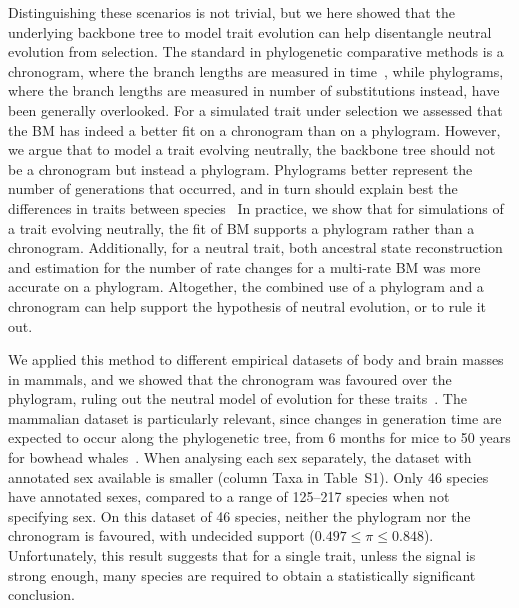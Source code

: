 \documentclass{article}
\newcommand{\PhyloSupport}{\pi}
\begin{document}
Distinguishing these scenarios is not trivial, but we here showed that the underlying backbone tree to model trait evolution can help disentangle neutral evolution from selection.
The standard in phylogenetic comparative methods is a chronogram, where the branch lengths are measured in time~\citep{felsenstein_phylogenies_1985, harmon_phylogenetic_2018}, while phylograms, where the branch lengths are measured in number of substitutions instead, have been generally overlooked.
For a simulated trait under selection we assessed that the BM has indeed a better fit on a chronogram than on a phylogram.
However, we argue that to model a trait evolving neutrally, the backbone tree should not be a chronogram but instead a phylogram.
Phylograms better represent the number of generations that occurred, and in turn should explain best the differences in traits between species~\citep{latrille_detecting_2024}
In practice, we show that for simulations of a trait evolving neutrally, the fit of BM supports a phylogram rather than a chronogram.
Additionally, for a neutral trait, both ancestral state reconstruction and estimation for the number of rate changes for a multi-rate BM was more accurate on a phylogram.
Altogether, the combined use of a phylogram and a chronogram can help support the hypothesis of neutral evolution, or to rule it out.

We applied this method to different empirical datasets of body and brain masses in mammals, and we showed that the chronogram was favoured over the phylogram, ruling out the neutral model of evolution for these traits~\citep{latrille_detecting_2024}.
The mammalian dataset is particularly relevant, since changes in generation time are expected to occur along the phylogenetic tree, from 6 months for mice to 50 years for bowhead whales~\citep{demagalhaes_database_2009, nielsen_eye_2016}.
When analysing each sex separately, the dataset with annotated sex available is smaller (column Taxa in Table~S1).
Only 46 species have annotated sexes, compared to a range of 125--217 species when not specifying sex.
On this dataset of 46 species, neither the phylogram nor the chronogram is favoured, with undecided support ($0.497 \leq \PhyloSupport \leq 0.848$).
Unfortunately, this result suggests that for a single trait, unless the signal is strong enough, many species are required to obtain a statistically significant conclusion.
\end{document}
